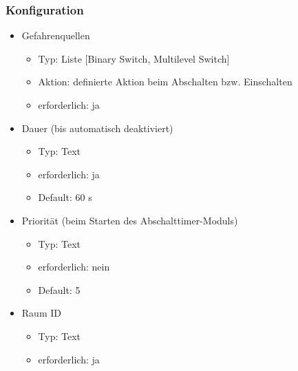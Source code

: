 \subsubsection{Konfiguration}
\begin{itemize}
	\item Gefahrenquellen
	\begin{itemize}
		\item Typ: Liste [Binary Switch, Multilevel Switch]
		\item Aktion: definierte Aktion beim Abschalten bzw. Einschalten
		\item erforderlich: ja
	\end{itemize}
	
	\item Dauer (bis automatisch deaktiviert)
	\begin{itemize}
		\item Typ: Text
		\item erforderlich: ja
		\item Default: 60 s
	\end{itemize}
	
	\item Priorität (beim Starten des Abschalttimer-Moduls)
	\begin{itemize}
		\item Typ: Text
		\item erforderlich: nein
		\item Default: 5
	\end{itemize}
	
	\item Raum ID
	\begin{itemize}
		\item Typ: Text
		\item erforderlich: ja
	\end{itemize}
\end{itemize}

